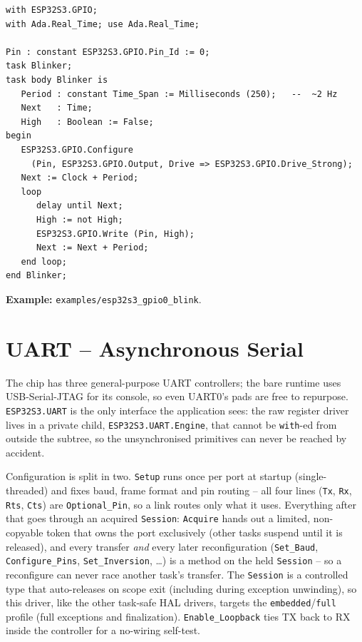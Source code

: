 \begin{lstlisting}
with ESP32S3.GPIO;
with Ada.Real_Time; use Ada.Real_Time;

Pin : constant ESP32S3.GPIO.Pin_Id := 0;
task Blinker;
task body Blinker is
   Period : constant Time_Span := Milliseconds (250);   --  ~2 Hz
   Next   : Time;
   High   : Boolean := False;
begin
   ESP32S3.GPIO.Configure
     (Pin, ESP32S3.GPIO.Output, Drive => ESP32S3.GPIO.Drive_Strong);
   Next := Clock + Period;
   loop
      delay until Next;
      High := not High;
      ESP32S3.GPIO.Write (Pin, High);
      Next := Next + Period;
   end loop;
end Blinker;
\end{lstlisting}


\noindent\textbf{Example:} \texttt{examples/esp32s3\_gpio0\_blink}.

\section{UART -- Asynchronous Serial}
\label{app:int:uart}

The chip has three general-purpose UART controllers; the bare runtime uses
USB-Serial-JTAG for its console, so even UART0's pads are free to repurpose.
\texttt{ESP32S3.UART} is the only interface the application sees: the raw
register driver lives in a private child, \texttt{ESP32S3.UART.Engine}, that
cannot be \texttt{with}-ed from outside the subtree, so the unsynchronised
primitives can never be reached by accident.

Configuration is split in two. \texttt{Setup} runs once per port at startup
(single-threaded) and fixes baud, frame format and pin routing -- all four
lines (\texttt{Tx}, \texttt{Rx}, \texttt{Rts}, \texttt{Cts}) are
\texttt{Optional\_Pin}, so a link routes only what it uses. Everything after
that goes through an acquired \texttt{Session}: \texttt{Acquire} hands out a
limited, non-copyable token that owns the port exclusively (other tasks suspend
until it is released), and every transfer \emph{and} every later
reconfiguration (\texttt{Set\_Baud}, \texttt{Configure\_Pins},
\texttt{Set\_Inversion}, \ldots) is a method on the held \texttt{Session} -- so
a reconfigure can never race another task's transfer. The \texttt{Session} is a
controlled type that auto-releases on scope exit (including during exception
unwinding), so this driver, like the other task-safe HAL drivers, targets the
\texttt{embedded}/\texttt{full} profile (full exceptions and finalization).
\texttt{Enable\_Loopback} ties TX back to RX inside the controller for a
no-wiring self-test.

